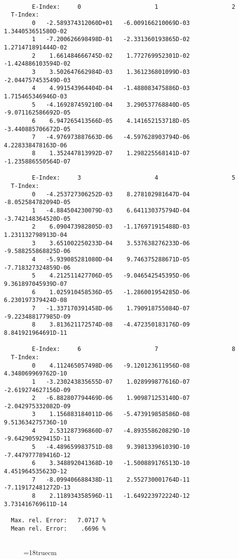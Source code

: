 \begin{verbatim}

        E-Index:     0                     1                     2
  T-Index:
        0   -2.589374312060D+01   -6.009166210069D-03    1.344053651580D-02
        1   -7.200626698498D-01   -2.331360193865D-02    1.271471891444D-02
        2    1.661484666745D-02    1.772769952301D-02   -1.424886103594D-02
        3    3.502647662984D-03    1.361236801099D-03   -2.044757453549D-03
        4    4.991543964404D-04   -1.488083475886D-03    1.715465346946D-03
        5   -4.169287459210D-04    3.290537768840D-05   -9.071162586692D-05
        6    6.947265413566D-05    4.141652153718D-05   -3.440885706672D-05
        7   -4.976973887663D-06   -4.597628903794D-06    4.228338478163D-06
        8    1.352447813992D-07    1.298225568141D-07   -1.235886550564D-07

        E-Index:     3                     4                     5
  T-Index:
        0   -4.253727306252D-03    8.278102981647D-04   -8.052584782094D-05
        1   -4.884504230079D-03    6.641130375794D-04   -3.742148364520D-05
        2    6.090473982805D-03   -1.176971915488D-03    1.231132798913D-04
        3    3.651002250233D-04    3.537638276233D-06   -9.588255868825D-06
        4   -5.939085281080D-04    9.746375288671D-05   -7.718327324859D-06
        5    4.212511427706D-05   -9.046542545395D-06    9.361897045939D-07
        6    1.025910458536D-05   -1.286001954285D-06    6.230197379424D-08
        7   -1.337170391458D-06    1.790918755084D-07   -9.223488177985D-09
        8    3.813621172574D-08   -4.472350183176D-09    8.841921964691D-11

        E-Index:     6                     7                     8
  T-Index:
        0    4.112465057498D-06   -9.120123611956D-08    4.348069969762D-10
        1   -3.230243835655D-07    1.028999877616D-07   -2.619274627156D-09
        2   -6.882807794469D-06    1.909871253140D-07   -2.042975332082D-09
        3    1.156883184011D-06   -5.473919858586D-08    9.513634275736D-10
        4    2.531287396860D-07   -4.893558620829D-10   -9.642905929415D-11
        5   -4.489659983751D-08    9.398133961039D-10   -7.447977789416D-12
        6    3.348892041368D-10   -1.500889176513D-10    4.451964535623D-12
        7   -8.099406688438D-11    2.552730001764D-11   -7.119172481272D-13
        8    2.118934358596D-11   -1.649223972224D-12    3.731416769611D-14

  Max. rel. Error:   7.0717 %
  Mean rel. Error:    .6696 %


\end{verbatim}
\begin{figure} \label{2.1.8r}
\epsfxsize=18truecm
\end{figure}
\newpage


